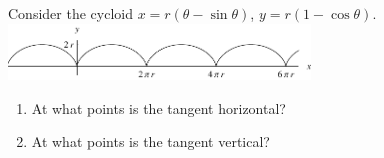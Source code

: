\begin{frame}[t]
\begin{example}[Example 2, p. 667]
Consider the cycloid $x = r(\theta - \sin \theta )$, $y = r(1 - \cos \theta )$.
\ \includegraphics[height=1.5cm]{parametric-curves/pictures/11-02-ex2a.pdf}%
\begin{enumerate}
\item  At what points is the tangent horizontal?
\item  At what points is the tangent vertical?
\end{enumerate}
\end{example}
\end{frame}


